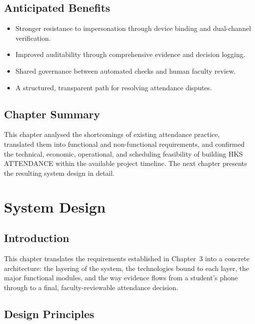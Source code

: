 \documentclass[12pt, a4paper, oneside]{report}
\begin{document}
\section{Anticipated Benefits}
\begin{itemize}
    \item Stronger resistance to impersonation through device binding and dual-channel verification.
    \item Improved auditability through comprehensive evidence and decision logging.
    \item Shared governance between automated checks and human faculty review.
    \item A structured, transparent path for resolving attendance disputes.
\end{itemize}

\section{Chapter Summary}

This chapter analysed the shortcomings of existing attendance practice, translated them into functional and non-functional requirements, and confirmed the technical, economic, operational, and scheduling feasibility of building HKS ATTENDANCE within the available project timeline. The next chapter presents the resulting system design in detail.

\chapter{System Design}
\label{chap:design}

\section{Introduction}
This chapter translates the requirements established in Chapter~3 into a concrete architecture: the layering of the system, the technologies bound to each layer, the major functional modules, and the way evidence flows from a student's phone through to a final, faculty-reviewable attendance decision.

\section{Design Principles}
\end{document}
